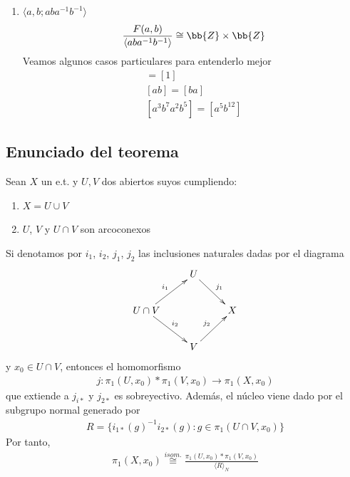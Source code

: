 \begin{ejemplo}
\begin{enumerate}
        \item $\langle a,b; aba^{-1}b^{-1} \rangle$
        \begin{gather*}
            \frac{F(a,b)}{\langle aba^{-1}b^{-1} \rangle} \cong \bb{Z}\times \bb{Z}
        \end{gather*}
        Veamos algunos casos particulares para entenderlo mejor
        \begin{gather*}
            [aba^{-1}b^{-1}] = [1]\\
            [ab] = [ba]\\
            [a^3b^7a^2b^5] = [a^5b^{12}]
        \end{gather*}
    \end{enumerate}
\end{ejemplo}

\subsection{Enunciado del teorema}

\begin{teo}
    Sean $X$ un e.t. y $U,V$ dos abiertos suyos cumpliendo:
    \begin{enumerate}
        \item $X=U\cup V$
        \item $U$, $V$ y $U\cap V$ son arcoconexos
    \end{enumerate}
    Si denotamos por $i_1$, $i_2$, $j_1$, $j_2$ las inclusiones naturales dadas por el diagrama
    \begin{gather*}
        \xymatrix{
            & U \ar[dr]^{j_1}\\
            U\cap V \ar[ur]^{i_1} \ar[dr]^{i_2} && X\\
            & V \ar[ur]^{j_2}
        }
    \end{gather*}
    y $x_0\in U\cap V$, entonces el homomorfismo
    \begin{gather*}
        j:\pi_1(U,x_0) \ast \pi_1(V,x_0) \to \pi_1(X,x_0)
    \end{gather*}
    que extiende a $j_{i*}$ y $j_{2*}$ es sobreyectivo. Además, el núcleo viene dado por el subgrupo normal generado por 
    \begin{gather*}
        R = \{i_{1*}(g)^{-1}i_{2*}(g) : g\in \pi_1(U\cap V,x_0)\}
    \end{gather*}
    Por tanto, 
    \begin{gather*}
        \pi_1(X,x_0) \overset{isom.}{\cong} \frac{\pi_1(U,x_0)\ast \pi_1(V,x_0)}{\langle R \rangle_N}
    \end{gather*}
\end{teo}

